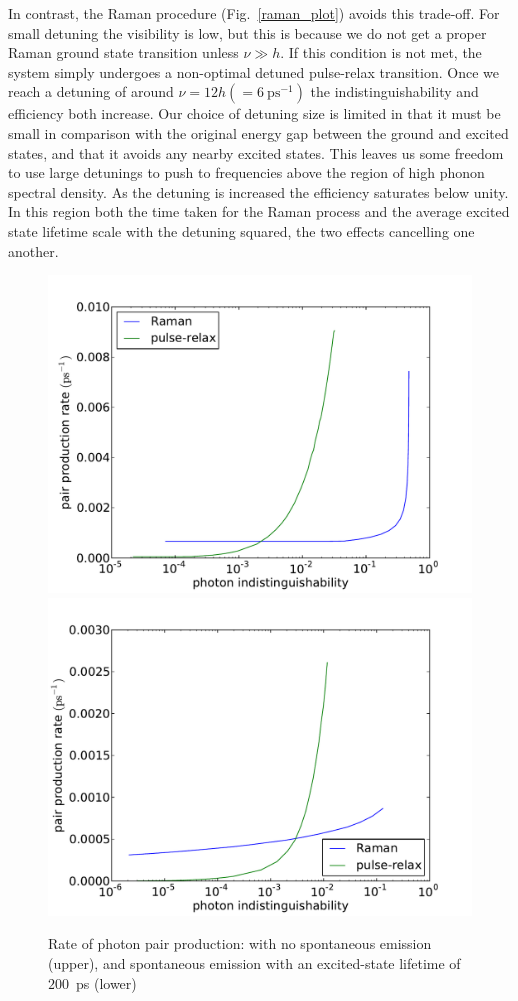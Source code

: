 In contrast, the Raman procedure (Fig.~\ref{raman_plot}) avoids this trade-off. For small detuning the visibility is low, but this is because we do not get a proper Raman ground state transition unless $\nu \gg h$. If this condition is not met, the system simply undergoes a non-optimal detuned pulse-relax transition. Once we reach a detuning of around $\nu = 12h (= 6~\mathrm{ps}^{-1})$ the indistinguishability and efficiency both  increase. Our choice of detuning size is limited in that it must be small in comparison with the original energy gap between the ground and excited states, and that it avoids any nearby excited states. This leaves us some freedom to use large detunings to push to frequencies above the region of high phonon spectral density. As the detuning is increased the efficiency saturates below unity. In this region both the time taken for the Raman process and the average excited state lifetime scale with the detuning squared, the two effects cancelling one another.

\begin{figure}[htb]
  \begin{center}
  \includegraphics[width=12cm]{assets/no_spont_prod_rate.pdf}
  \includegraphics[width=12cm]{assets/rate_of_production_plot.pdf}
  \end{center}
  \caption{Rate of photon pair production: with no spontaneous emission (upper), and spontaneous emission with an excited-state lifetime of $200$~ps (lower)}
  \label{rate_of_production_plot}
\end{figure}

